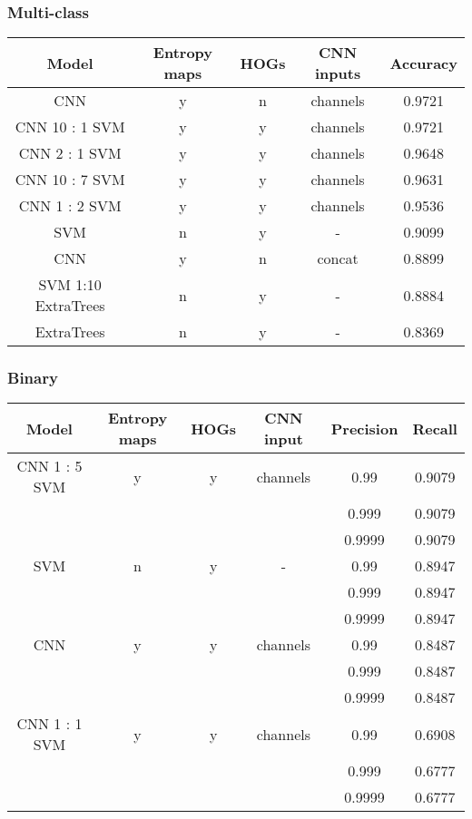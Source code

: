        \subsubsection{Multi-class}
        \begin{center}
        \small
        \begin{tabular}{ |c|c|c|c|c| }
            \hline
            Model & Entropy maps & HOGs & CNN inputs & Accuracy\\
            \hline
            CNN & y & n & channels & 0.9721\\
            \hline
            CNN 10 : 1 SVM & y & y & channels & 0.9721\\
            \hline
            CNN 2 : 1 SVM & y & y & channels & 0.9648\\
            \hline
            CNN 10 : 7 SVM & y & y & channels & 0.9631\\
            \hline
            CNN 1 : 2 SVM & y & y & channels & 0.9536\\
            \hline
            SVM & n & y & - & 0.9099\\
            \hline
            CNN & y & n & concat & 0.8899\\
            \hline
            SVM 1:10 ExtraTrees & n & y & - & 0.8884\\
            \hline
            ExtraTrees & n & y & - & 0.8369\\
            \hline
        \end{tabular}
        \end{center}

        \subsubsection{Binary}
        \begin{center}
        \small
        \begin{tabular}{ |c|c|c|c|c|c| }
            \hline
            Model & Entropy maps & HOGs & CNN input & Precision & Recall\\
        \hline
        CNN 1 : 5 SVM & y & y & channels & 0.99 & 0.9079\\
        & & & & 0.999 & 0.9079\\
        & & & & 0.9999 & 0.9079\\
        \hline
        SVM & n & y & - & 0.99 & 0.8947 \\
        & & & & 0.999 & 0.8947\\
        & & & & 0.9999 & 0.8947\\
        \hline
        CNN & y & y & channels & 0.99 & 0.8487 \\
        & & & & 0.999 & 0.8487\\
        & & & & 0.9999 & 0.8487\\
        \hline
        CNN 1 : 1 SVM & y & y & channels & 0.99 & 0.6908\\
        & & & & 0.999 & 0.6777\\
        & & & & 0.9999 & 0.6777\\
        \hline

        \end{tabular}
        \end{center}

